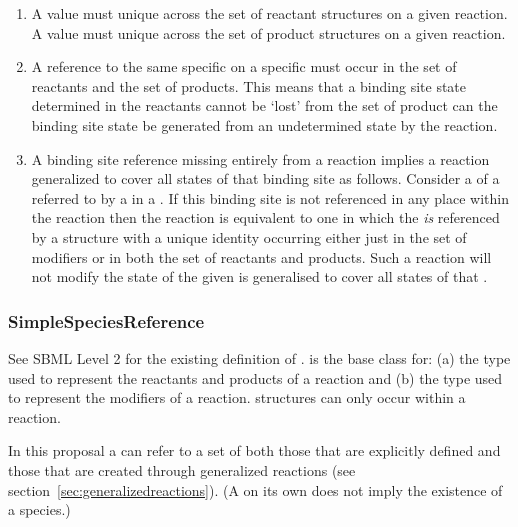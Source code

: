 \documentclass{cekarticle}
\begin{document}
\begin{enumerate}

\item A   value must unique
across the set of reactant  structures on
a given reaction. A   value
must unique across the set of product 
structures on a given reaction.

\item A reference to the same specific  on a
specific  must occur in the set of
reactants and the set of products.  This means that a binding site
state determined in the reactants cannot be `lost' from the set of
product can the binding site state be generated from an
undetermined state by the reaction.

\item A binding site reference missing entirely from a reaction
implies a reaction generalized to cover all states of that binding
site as follows. Consider a  of a
 referred to by a 
in a .  If this binding site is not referenced in
any place within the reaction then the reaction is equivalent to
one in which the  \emph{is} referenced by a
 structure with a unique identity occurring
either just in the set of modifiers or in both the set of
reactants and products.  Such a reaction will not modify the state
of the given  is generalised to cover all
states of that .

\end{enumerate}

\subsubsection{SimpleSpeciesReference}

See SBML Level 2 for the existing definition of .
 is the base class for: (a)  the type used
to represent the reactants and products of a reaction and (b)  the
type used to represent the modifiers of a reaction.   structures
can only occur within a reaction.

In this proposal a  can refer to a
set of  both those that are explicitly defined and
those that are created through generalized reactions (see
section~\ref{sec:generalizedreactions}).  (A
 on its own does not imply the
existence of a species.)
\end{document}
